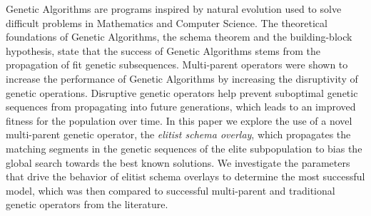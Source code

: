 Genetic Algorithms are programs inspired by natural evolution used to solve difficult problems in Mathematics and Computer Science. The theoretical foundations of Genetic Algorithms, the schema theorem and the building-block hypothesis, state that the success of Genetic Algorithms stems from the propagation of fit genetic subsequences. Multi-parent operators were shown to increase the performance of Genetic Algorithms by increasing the disruptivity of genetic operations. Disruptive genetic operators help prevent suboptimal genetic sequences from propagating into future generations, which leads to an improved fitness for the population over time. In this paper we explore the use of a novel multi-parent genetic operator, the \emph{elitist schema overlay}, which propagates the matching segments in the genetic sequences of the elite subpopulation to bias the global search towards the best known solutions. We investigate the parameters that drive the behavior of elitist schema overlays to determine the most successful model, which was then compared to successful multi-parent and traditional genetic operators from the literature. 